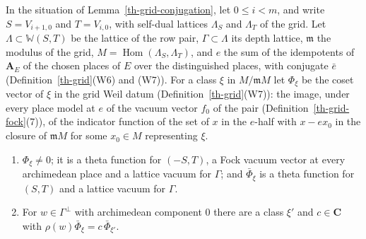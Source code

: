 \begin{lemma}\label{th-coset-vectors}
In the situation of Lemma~\ref{th-grid-conjugation}, let $0\leq i<m$, and write
$S=V_{i+1,0}$ and $T=V_{i,0}$, with self-dual lattices $\Lambda_S$ and
$\Lambda_T$ of the grid. Let $\Lambda\subset\mathbb W(S,T)$ be the lattice of
the row pair, $\Gamma\subset\Lambda$ its depth lattice, $\mathfrak m$ the
modulus of the grid, $M=\operatorname{Hom}(\Lambda_S,\Lambda_T)$, and $e$ the
sum of the idempotents of $\mathbf A_E$ of the chosen places of $E$ over the
distinguished places, with conjugate $\bar e$ (Definition~\ref{th-grid}(W6)
and (W7)). For a class $\xi$ in $M/\mathfrak mM$ let $\Phi_\xi$ be the coset
vector of $\xi$ in the grid Weil datum (Definition~\ref{th-grid}(W7)): the
image, under every place model at $e$ of the vacuum vector $f_0$ of the pair
(Definition~\ref{th-grid-fock}(7)), of the indicator function of the set of
$x$ in the $e$-half with $x-ex_0$ in the closure of $\mathfrak mM$ for some
$x_0\in M$ representing $\xi$.
\begin{enumerate}
\item $\Phi_\xi\neq0$; it is a theta function for $(-S,T)$, a Fock vacuum vector
  at every archimedean place and a lattice vacuum for $\Gamma$; and
  $\bar\Phi_\xi$ is a theta function for $(S,T)$ and a lattice vacuum for
  $\Gamma$.
\item For $w\in\Gamma^\perp$ with archimedean component $0$ there are a class
  $\xi'$ and $c\in\mathbf C$ with $\rho(w)\bar\Phi_\xi=c\,\bar\Phi_{\xi'}$.
\end{enumerate}
\end{lemma}
